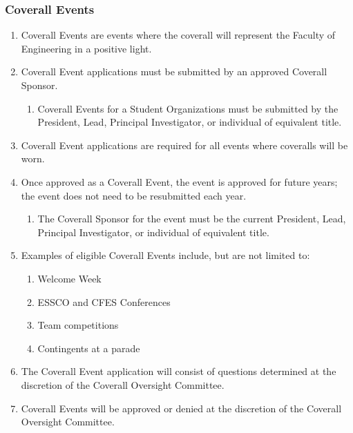 \begin{enumerate}
\begin{enumerate}
\end{enumerate}
\hypertarget{coverall-events}{%
 \subsubsection{Coverall Events}
 \label{coverall-events}}
\begin{enumerate}
 \item
  Coverall Events are events where the coverall will represent the
  Faculty of Engineering in a positive light.
 \item
  Coverall Event applications must be submitted by an approved Coverall
  Sponsor.

  \begin{enumerate}
   \item
    Coverall Events for a Student Organizations must be submitted by the
    President, Lead, Principal Investigator, or individual of equivalent
    title.
  \end{enumerate}
 \item
  Coverall Event applications are required for all events where
  coveralls will be worn.
 \item
  Once approved as a Coverall Event, the event is approved for future
  years; the event does not need to be resubmitted each year.

  \begin{enumerate}
   \item
    The Coverall Sponsor for the event must be the current President,
    Lead, Principal Investigator, or individual of equivalent title.
  \end{enumerate}
 \item
  Examples of eligible Coverall Events include, but are not limited to:

  \begin{enumerate}
   \item
    Welcome Week
   \item
    ESSCO and CFES Conferences
   \item
    Team competitions
   \item
    Contingents at a parade
  \end{enumerate}
 \item
  The Coverall Event application will consist of questions determined at
  the discretion of the Coverall Oversight Committee.
 \item
  Coverall Events will be approved or denied at the discretion of the
  Coverall Oversight Committee.


\end{enumerate}
\end{enumerate}
